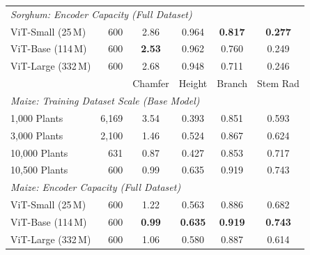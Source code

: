 \documentclass[10pt,twocolumn,letterpaper]{article}
\begin{document}
\begin{table}[t]
\begin{minipage}[t]{0.45\textwidth}
{\begin{tabular}{l r c ccc}
    \multicolumn{6}{l}{\emph{Sorghum: Encoder Capacity (Full Dataset)}} \\
    ViT-Small (25\,M) & 600 & 2.86 & 0.964 & \textbf{0.817} & \textbf{0.277} \\
    ViT-Base (114\,M) & 600 & \textbf{2.53} & 0.962 & 0.760 & 0.249 \\
    ViT-Large (332\,M) & 600 & 2.68 & 0.948 & 0.711 & 0.246 \\
    \midrule
    & & Chamfer & Height & Branch & Stem Rad \\
    \multicolumn{6}{l}{\emph{Maize: Training Dataset Scale (Base Model)}} \\
    1{,}000 Plants & 6{,}169 & 3.54 & 0.393 & 0.851 & 0.593 \\
    3{,}000 Plants & 2{,}100 & 1.46 & 0.524 & 0.867 & 0.624 \\
    10{,}000 Plants & 631 & 0.87 & 0.427 & 0.853 & 0.717 \\
    10{,}500 Plants & 600 & 0.99 & 0.635 & 0.919 & 0.743 \\
    \multicolumn{6}{l}{\emph{Maize: Encoder Capacity (Full Dataset)}} \\
    ViT-Small (25\,M) & 600 & 1.22 & 0.563 & 0.886 & 0.682 \\
    ViT-Base (114\,M) & 600 & \textbf{0.99} & \textbf{0.635} & \textbf{0.919} & \textbf{0.743} \\
    ViT-Large (332\,M) & 600 & 1.06 & 0.580 & 0.887 & 0.614 \\
    \bottomrule
  \end{tabular}}
  \end{minipage}
\end{table}
\end{document}

